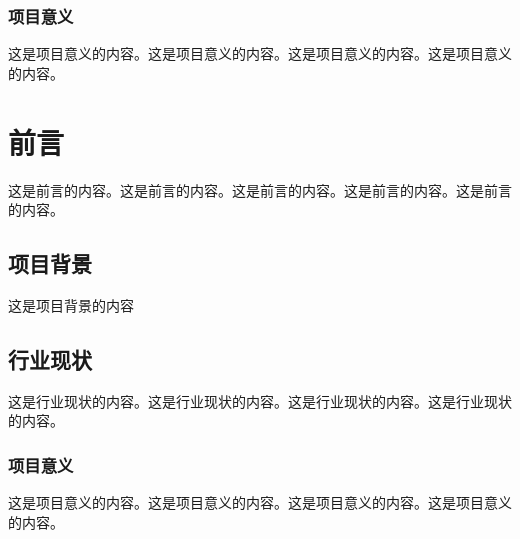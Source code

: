 \begin{ujnbody}
    \subsubsection{项目意义}
    这是项目意义的内容。这是项目意义的内容。这是项目意义的内容。这是项目意义的内容。
    \section{前言}
    这是前言的内容。这是前言的内容。这是前言的内容。这是前言的内容。这是前言的内容。
    \subsection{项目背景}
    这是项目背景的内容
    \subsection{行业现状}
    这是行业现状的内容。这是行业现状的内容。这是行业现状的内容。这是行业现状的内容。
    \subsubsection{项目意义}
    这是项目意义的内容。这是项目意义的内容。这是项目意义的内容。这是项目意义的内容。
    \end{ujnbody}
    